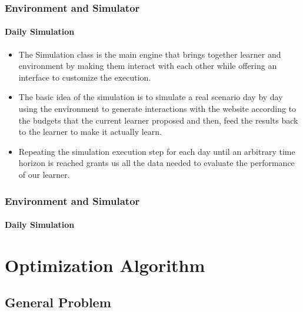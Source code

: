 \documentclass[11pt]{beamer}
\begin{document}

\begin{frame}

\frametitle{Environment and Simulator}
\framesubtitle{Daily Simulation}

\begin{itemize}[leftmargin=*, label={$\circ$}]
    \item The Simulation class is the main engine that brings together learner and environment by making them interact with each other while offering an interface to customize the execution.
    \item The basic idea of the simulation is to simulate a real scenario day by day using the environment to generate interactions with the website according to the budgets that the current learner proposed and then, feed the results back to the learner to make it actually learn.
    \item Repeating the simulation execution step for each day until an arbitrary time horizon is reached grants us all the data needed to evaluate the performance of our learner.
\end{itemize}

\end{frame}


\begin{frame}

\frametitle{Environment and Simulator}
\framesubtitle{Daily Simulation}


\end{frame}


\AtBeginSection[]
{
\begin{frame}{}
    \tableofcontents[sections={\thesection}]
\end{frame}
}


\section{Optimization Algorithm}


\subsection{General Problem}
\end{document}
